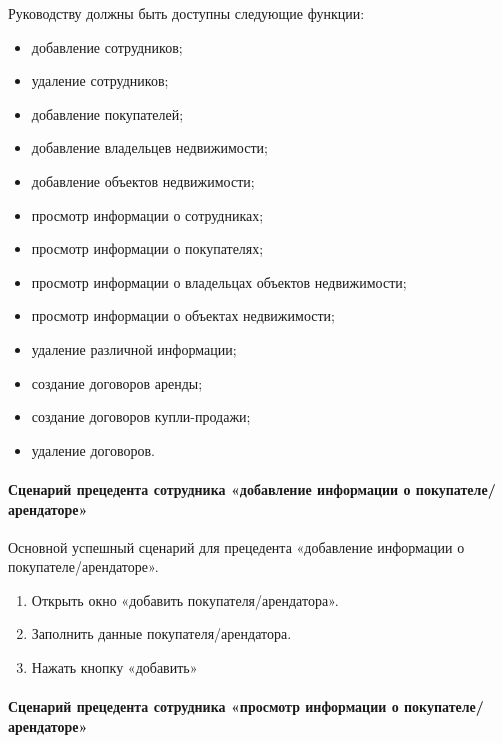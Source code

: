 Руководству должны быть доступны следующие функции:
\begin{itemize}
\item	добавление сотрудников;

\item	удаление сотрудников;

\item	добавление покупателей;

\item	добавление владельцев недвижимости;

\item	добавление объектов недвижимости;

\item	просмотр информации о сотрудниках;

\item	просмотр информации о покупателях;

\item	просмотр информации о владельцах объектов недвижимости;

\item	просмотр информации о объектах недвижимости;

\item	удаление  различной информации;

\item	создание договоров аренды;

\item	создание договоров купли-продажи;

\item	удаление договоров.
\end{itemize}
\paragraph{Сценарий прецедента сотрудника «добавление информации о покупателе/арендаторе»}

Основной успешный сценарий для прецедента «добавление информации о покупателе/арендаторе».
\begin{enumerate}
\item	Открыть окно «добавить покупателя/арендатора».

\item	Заполнить данные покупателя/арендатора.

\item	Нажать кнопку «добавить»
\end{enumerate}
\paragraph{Сценарий прецедента сотрудника «просмотр информации о покупателе/арендаторе»}

